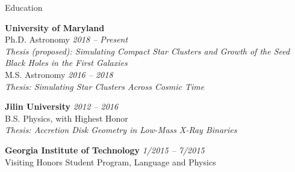 \documentclass[letterpaper]{resume} %
\begin{document}

\begin{rSection}{Education}

  {\bf University of Maryland} \\
  Ph.D. Astronomy \hfill {\em 2018 -- Present} \\
  \vspace{-1mm}
  \hspace{6mm} \emph{\small Thesis (proposed): Simulating Compact Star Clusters and Growth of the Seed Black Holes in the First Galaxies}\\
  \vspace{1mm}
  M.S. Astronomy \hfill{\em 2016 -- 2018} \\
  \vspace{-1mm}
  \hspace{6mm} \emph{\small Thesis: Simulating Star Clusters Across Cosmic Time}

\item {\bf Jilin University} \hfill {\em 2012 -- 2016} \\
  B.S. Physics, with Highest Honor
  \\ %
  \vspace{-1mm} \hspace{6mm} \emph{\small Thesis: Accretion Disk
    Geometry in Low-Mass X-Ray Binaries}
\item {\bf Georgia Institute of Technology} \hfill {\em 1/2015 --
    7/2015}\\
  Visiting Honors Student Program, Language and Physics

\end{rSection}

\end{document}
